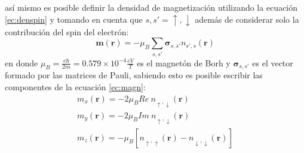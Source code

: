 \documentclass[12pt,a4paper, oneside]{book}
\begin{document}
	as\'i mismo es posible definir la densidad de magnetizaci\'on utilizando la ecuaci\'on \ref{ec:denspin} y tomando en cuenta que $s, s ' = \uparrow, \downarrow $ adem\'as de considerar solo la contribuci\'on del spin del electr\'on:
	\begin{equation}
	\pmb{m} (\pmb{r}) = - \mu_{B} \sum_{s,s '} \pmb{\sigma}_{s,s'} n_{s ', s }(\pmb{r}) \label{ec:magn}
	\end{equation}
	en donde $\mu_B= \frac{e \hbar}{2 m} = 0.579 \times 10^{-4} \frac{eV}{T}$ es el magnet\'on de Borh y $ \pmb{\sigma}_{s,s'}$ es el vector formado por las matrices de Pauli, sabiendo esto es posible escribir las componentes de la ecuaci\'on \ref{ec:magn}:
	\begin{subequations} \label{ec:compm}
		\begin{gather}
		m_x (\pmb{r})= -2 \mu_{B} Re~ n_{\uparrow, \downarrow} (\pmb{r}) \label{ec:compm1}\\
		m_y (\pmb{r})= -2 \mu_{B} Im~ n_{\uparrow, \downarrow} (\pmb{r}) \label{ec:compm2}\\
		m_z (\pmb{r}) = - \mu_{B} [n_{\uparrow, \uparrow} (\pmb{r})- n_{\downarrow, \downarrow} (\pmb{r})] \label{ec:compm3}
		\end{gather}
	\end{subequations}
  
\end{document}
